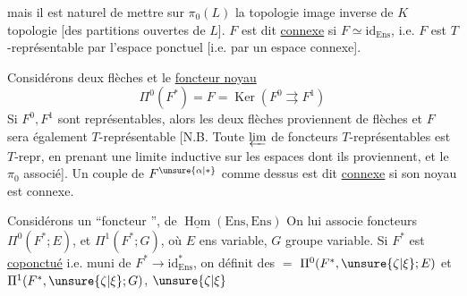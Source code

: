 mais il est naturel de mettre sur $\pi_0(L)$ la topologie image inverse de
$K$ topologie  [des partitions ouvertes de $L$].
$F$ est dit \uline{connexe} si $F\simeq\mathrm{id}_{\mathrm{Ens}}$,
i.e. $F$ est $T$-représentable par l'espace ponctuel
[i.e. par un espace connexe].

Considérons deux  flèches
et le \uline{foncteur noyau}
\[
\Pi^0(F^*)=F=\operatorname{Ker}(F^0\rightrightarrows F^1)
\]
Si $F^0,F^1$ sont représentables,
alors les deux flèches proviennent de flèches
et $F$ sera également $T$-représentable
[N.B. Toute $\varprojlim$ de foncteurs $T$-représentables est $T$-repr,
en prenant une limite inductive sur les espaces dont ils proviennent,
\deleted{$\unsure{\xi}$} et le $\pi_0$ associé].
Un couple de $F^{\unsure{\alpha|*}}$ comme dessus est dit
\uline{connexe} si son noyau est connexe.

Considérons un ``foncteur '',
de $\underline{\operatorname{Hom}}(\mathrm{Ens},\mathrm{Ens})$
On lui associe foncteurs $\Pi^0(F^*;E)$,
 et $\Pi^1(F^*;G)$,
où $E$ ens variable, $G$ groupe variable.
Si $F^*$ est \uline{coponctué} i.e. muni de
$F^*\to\mathrm{id}_{\mathrm{Ens}}^*$, on définit des $=$
$\Pi^0(F^*,\unsure{\zeta|\xi};E)$ et
$\Pi^1(F^*,\unsure{\zeta|\xi};G)$, $\unsure{\zeta|\xi}$
